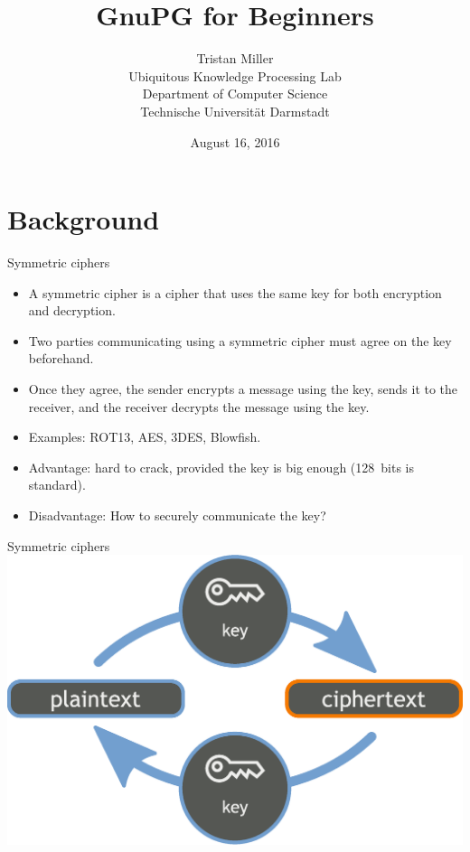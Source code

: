 \documentclass[%
mode=present,%
paper=smartboard,
size=20pt,
]{powerdot}
\title{GnuPG for Beginners}
\author{%
  Tristan Miller\\
  Ubiquitous Knowledge Processing Lab\\
  Department of Computer Science\\
  Technische Universit\"at Darmstadt
}
\date{August 16, 2016}
\begin{document}
\maketitle

\section{Background}
\begin{slide}{Symmetric ciphers}
  \begin{itemize}
  \item A symmetric cipher is a cipher that uses the same key for both
    encryption and decryption.
  \item Two parties communicating using a symmetric cipher must agree
    on the key beforehand.
  \item Once they agree, the sender encrypts a message using the key,
    sends it to the receiver, and the receiver decrypts the message
    using the key.
  \item Examples: ROT13, AES, 3DES, Blowfish.
  \item Advantage: hard to crack, provided the key is big enough (128~bits is
    standard).
  \item Disadvantage: How to securely communicate the key?
  \end{itemize}
\end{slide}

\begin{slide}[toc=]{Symmetric ciphers}
\centering\includegraphics[width=0.9\linewidth]{images/Orange_blue_symmetric_cryptography_en}
\end{slide}
\end{document}
